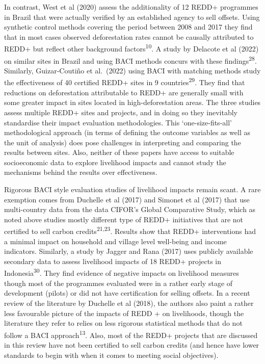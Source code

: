 \documentclass[
]{article}
\begin{document}
In contrast, West et al (2020) assess the additionality of 12 REDD+
programmes in Brazil that were actually verified by an established
agency to sell offsets. Using synthetic control methods covering the
period between 2008 and 2017 they find that in most cases observed
deforestation rates cannot be causally attributed to REDD+ but reflect
other background factors\textsuperscript{10}. A study by Delacote et al
(2022) on similar sites in Brazil and using BACI methods concurs with
these findings\textsuperscript{28}. Similarly, Guizar‐Coutiño et
al.~(2022) using BACI with matching methods study the effectiveness of
40 certified REDD+ sites in 9 countries\textsuperscript{29}. They find
that reductions on deforestation attributable to REDD+ are generally
small with some greater impact in sites located in high-deforestation
areas. The three studies assess multiple REDD+ sites and projects, and
in doing so they inevitably standardise their impact evaluation
methodologies. This `one-size-fits-all' methodological approach (in
terms of defining the outcome variables as well as the unit of analysis)
does pose challenges in interpreting and comparing the results between
sites. Also, neither of these papers have access to suitable
socioeconomic data to explore livelihood impacts and cannot study the
mechanisms behind the results over effectiveness.

Rigorous BACI style evaluation studies of livelihood impacts remain
scant. A rare exemption comes from Duchelle et al (2017) and Simonet et
al (2017) that use multi-country data from the data CIFOR's Global
Comparative Study, which as noted above studies mostly different type of
REDD+ initiatives that are not certified to sell carbon
credits\textsuperscript{21,23}. Results show that REDD+ interventions
had a minimal impact on household and village level well-being and
income indicators. Similarly, a study by Jagger and Rana (2017) uses
publicly available secondary data to assess livelihood impacts of 18
REDD+ projects in Indonesia\textsuperscript{30}. They find evidence of
negative impacts on livelihood measures though most of the programmes
evaluated were in a rather early stage of development (pilots) or did
not have certification for selling offsets. In a recent review of the
literature by Duchelle et al (2018), the authors also paint a rather
less favourable picture of the impacts of REDD + on livelihoods, though
the literature they refer to relies on less rigorous statistical methods
that do not follow a BACI approach\textsuperscript{13}. Also, most of
the REDD+ projects that are discussed in this review have not been
certified to sell carbon credits (and hence have lower standards to
begin with when it comes to meeting social objectives).
\end{document}

